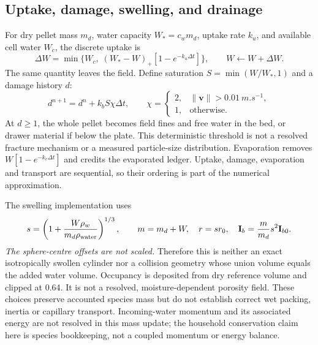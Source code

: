 \subsection{Uptake, damage, swelling, and drainage}
For dry pellet mass $m_d$, water capacity $W_*=c_wm_d$, uptake rate $k_u$, and
available cell water $W_c$, the discrete uptake is
\begin{equation}
 \Delta W=\min\{W_c,\;(W_*-W)_+[1-e^{-k_u\Delta t}]\},\qquad
 W\leftarrow W+\Delta W. \label{eq:uptake}
\end{equation}
The same quantity leaves the field. Define saturation
$S=\min(W/W_*,1)$ and a damage history $d$:
\begin{equation}
 d^{n+1}=d^n+k_bS\chi\Delta t,\qquad
 \chi=\begin{cases}2,&\|\mathbf{v}\|>\SI{0.01}{m.s^{-1}},\\1,&\text{otherwise}.
 \end{cases} \label{eq:damage}
\end{equation}
At $d\geq1$, the whole pellet becomes field fines and free water in the bed,
or drawer material if below the plate. This deterministic threshold is not a
resolved fracture mechanism or a measured particle-size distribution.
Evaporation removes $W[1-e^{-k_e\Delta t}]$ and credits the evaporated ledger.
Uptake, damage, evaporation and transport are sequential, so their ordering
is part of the numerical approximation.

The swelling implementation uses
\begin{equation}
 s=\left(1+\frac{W\rho_w}{m_d\rho_{\rm water}}\right)^{1/3},\qquad
 m=m_d+W,\quad r=sr_0,\quad
 \mathbf{I}_b=\frac{m}{m_d}s^2\mathbf{I}_{b0}. \label{eq:swelling}
\end{equation}
\emph{The sphere-centre offsets are not scaled.} Therefore this is neither an
exact isotropically swollen cylinder nor a collision geometry whose union volume
equals the added water volume. Occupancy is deposited from dry reference volume
and clipped at 0.64. It is not a resolved, moisture-dependent porosity field.
These choices preserve accounted species mass but do not establish correct
wet packing, inertia or capillary transport. Incoming-water momentum and its
associated energy are not resolved in this mass update; the household
conservation claim here is species bookkeeping, not a coupled momentum or
energy balance.

